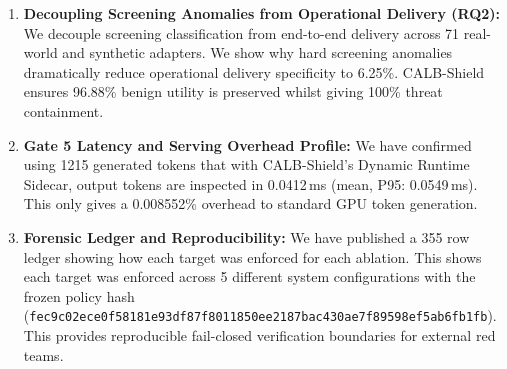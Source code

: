 \begin{enumerate}
    \item \textbf{Decoupling Screening Anomalies from Operational Delivery (RQ2):} We decouple screening classification from end-to-end delivery across 71 real-world and synthetic adapters. We show why hard screening anomalies dramatically reduce operational delivery specificity to 6.25\%. CALB-Shield ensures 96.88\% benign utility is preserved whilst giving 100\% threat containment.
    \item \textbf{Gate 5 Latency and Serving Overhead Profile:} We have confirmed using 1215 generated tokens that with CALB-Shield's Dynamic Runtime Sidecar, output tokens are inspected in 0.0412\,ms (mean, P95: 0.0549\,ms). This only gives a 0.008552\% overhead to standard GPU token generation.
    \item \textbf{Forensic Ledger and Reproducibility:} We have published a 355 row ledger showing how each target was enforced for each ablation. This shows each target was enforced across 5 different system configurations with the frozen policy hash (\nolinkurl{fec9c02ece0f58181e93df87f8011850ee2187bac430ae7f89598ef5ab6fb1fb}). This provides reproducible fail-closed verification boundaries for external red teams.
\end{enumerate}
